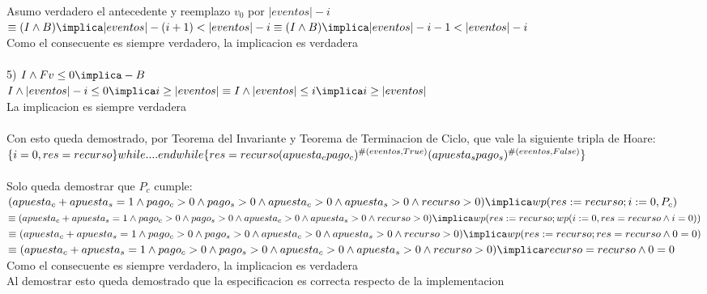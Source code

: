 \documentclass[10pt,a4paper]{article}
\begin{document}
Asumo verdadero el antecedente y reemplazo $v _0$ por $ |eventos|-i $\\
$\equiv (I \land B ) \implica |eventos|-(i+1) < |eventos|-i \equiv (I \land B ) \implica |eventos|-i-1 < |eventos|-i $\\

Como el consecuente es siempre verdadero, la implicacion es verdadera\\\\
%
%
%
%
5) $I  \land Fv \leq 0 \implica -B$\\

$ I  \land |eventos| - i \leq 0 \implica i \geq |eventos| \equiv I  \land |eventos| \leq i \implica i \geq |eventos|$\\

La implicacion es siempre verdadera\\\\


Con esto queda demostrado, por Teorema del Invariante y Teorema de Terminacion de Ciclo, que vale la siguiente tripla de Hoare:\\
$\{i=0, res=recurso\}  while....endwhile  \{res = recurso(apuesta _c  pago _c)^{\symbol{35}(eventos, True)} (apuesta _s pago _s)^{\symbol{35}(eventos, False)}\}$\\\\

Solo queda demostrar que $P _c $ cumple:\\

${(apuesta _c + apuesta _s = 1 \land pago _c > 0 \land pago _s > 0 \land apuesta _c > 0 \land apuesta _s > 0 \land recurso > 0)} \implica\\ wp(res:=recurso; i:=0, P _c)$\\

${\equiv(apuesta _c + apuesta _s = 1 \land pago _c > 0 \land pago _s > 0 \land apuesta _c > 0 \land apuesta _s > 0 \land recurso > 0)} \implica\\ wp(res:=recurso; wp(i:=0, res=recurso \land i=0))$\\

${\equiv(apuesta _c + apuesta _s = 1 \land pago _c > 0 \land pago _s > 0 \land apuesta _c > 0 \land apuesta _s > 0 \land recurso > 0)} \implica\\ wp(res:=recurso; res=recurso \land 0=0)$\\

${\equiv(apuesta _c + apuesta _s = 1 \land pago _c > 0 \land pago _s > 0 \land apuesta _c > 0 \land apuesta _s > 0 \land recurso > 0)} \implica\\ recurso=recurso \land 0=0$\\

Como el consecuente es siempre verdadero, la implicacion es verdadera\\

Al demostrar esto queda demostrado que la especificacion es correcta respecto de la implementacion
\end{document}
